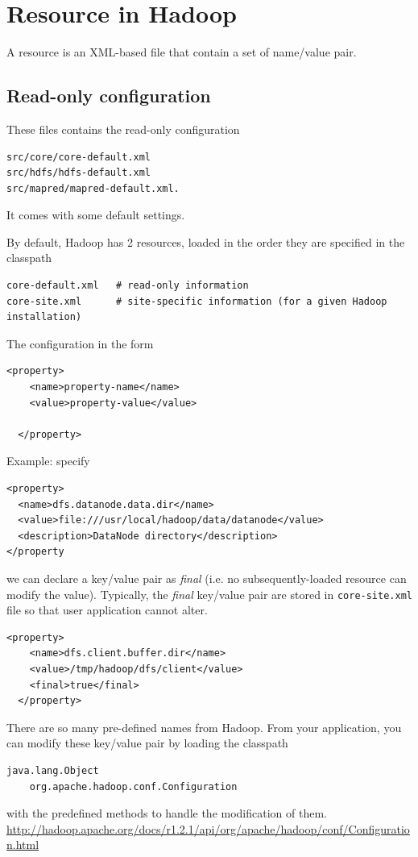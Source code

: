 \section{Resource in Hadoop}
\label{sec:Hadoop_resources}

A resource is an XML-based file that contain a set of name/value pair.

\subsection{Read-only configuration}

These files contains the read-only configuration
\begin{verbatim}
src/core/core-default.xml 
src/hdfs/hdfs-default.xml 
src/mapred/mapred-default.xml.
\end{verbatim}
It comes with some default settings. 


By default, Hadoop has 2 resources, loaded in the order they are specified
in the classpath
\begin{verbatim}
core-default.xml   # read-only information
core-site.xml      # site-specific information (for a given Hadoop installation)
\end{verbatim}

The configuration in the form
\begin{verbatim}
<property>
    <name>property-name</name>
    <value>property-value</value>

  </property>
\end{verbatim}

Example: specify 
\begin{verbatim}
<property>
  <name>dfs.datanode.data.dir</name>
  <value>file:///usr/local/hadoop/data/datanode</value>
  <description>DataNode directory</description>
</property
\end{verbatim}
we can declare a key/value pair as {\it final} (i.e. no subsequently-loaded
resource can modify the value). Typically, the {\it final} key/value pair are
stored in \verb!core-site.xml! file so that user application cannot alter.
\begin{verbatim}
<property>
    <name>dfs.client.buffer.dir</name>
    <value>/tmp/hadoop/dfs/client</value>
    <final>true</final>
  </property>
\end{verbatim}


There are so many pre-defined names from Hadoop. From your application, you can
modify these key/value pair by loading the classpath
\begin{verbatim}
java.lang.Object
    org.apache.hadoop.conf.Configuration
\end{verbatim}
with the predefined methods to handle the modification of them.
\url{http://hadoop.apache.org/docs/r1.2.1/api/org/apache/hadoop/conf/Configuration.html}

